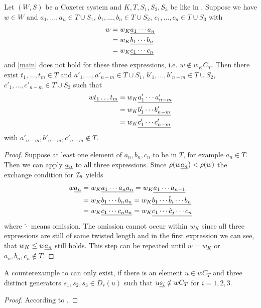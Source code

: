 \begin{prop}
\label{counterexample-simplification}
Let $(W,S)$ be a Coxeter system and $K,T,S_1,S_2,S_3$ be like in
. Suppose we have $w \in W$ and $a_1,\ldots,a_n \in T \cup
S_1$, $b_1,\ldots,b_n \in T \cup S_2$, $c_1,\ldots,c_n \in T \cup S_3$ with
\begin{align*}
w & = w_K \underline{ a_1 \cdots a_n } \\
  & = w_K \underline{ b_1 \cdots b_n } \\
  & = w_K \underline{ c_1 \cdots c_n }
\end{align*}
and \eqref{main} does not hold for these three expressions, i.e. $w
\notin w_K C_T$.
Then there exist $t_1,\ldots,t_m \in T$ and $a'_1,\ldots,a'_{n-m} \in T \cup S_1$,
$b'_1,\ldots,b'_{n-m} \in T \cup S_2$, $c'_1,\ldots,c'_{n-m} \in T \cup S_3$ such that
\begin{align*}
w \underline{t_1 \ldots t_m} & = w_K \underline{ a'_1 \cdots a'_{n-m} } \\
                       & = w_K \underline{ b'_1 \cdots b'_{n-m} } \\
                       & = w_K \underline{ c'_1 \cdots c'_{n-m} }
\end{align*}
with $a'_{n-m},b'_{n-m},c'_{n-m} \notin T$.

\begin{proof}
Suppose at least one element of $a_n,b_n,c_n$ to be in $T$, for example $a_n \in T$.
Then we can apply $\underline{a_n}$ to all three expressions. Since $\rho (w \underline{a_n}) < \rho(w)$
the exchange condition for $\mathcal{I}_{\theta}$ \cite[Proposition 3.10]{hultman:comb-twisted-invo}
yields
\begin{align*}
w \underline{a_n} & = w_K \underline{ a_1 \cdots a_n a_n } = w_K \underline{ a_1 \cdots a_{n-1} } \\
           & = w_K \underline{ b_1 \cdots b_n a_n } = w_K \underline{ b_1 \cdots \hat b_i \cdots b_n } \\
           & = w_K \underline{ c_1 \cdots c_n a_n } = w_K \underline{ c_1 \cdots \hat c_j \cdots c_n }
\end{align*}
where $\hat \cdot$ means omission. The omission cannot occur within $w_K$ since all three
expressions are still of same twisted length and in the first expression we can see, that
$w_K \leq w \underline{a_n}$ still holds. This step can be repeated until $w = w_K$ or
$a_n,b_n,c_n \notin T$.
\end{proof}
\end{prop}

\begin{lemm}
\label{counterexample-simplification}
A counterexample to  can only exist, if there
is an element $u \in w C_T$ and three distinct generators $s_1,s_2,s_3 \in
D_r(u)$ such that $u \underline{s_i} \notin w C_T$ for $i=1,2,3$.

\begin{proof}
According to .
\end{proof}
\end{lemm}

